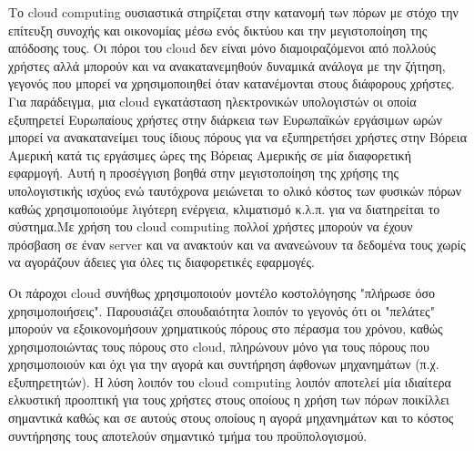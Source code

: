 	Το cloud computing ουσιαστικά στηρίζεται στην κατανομή των πόρων με στόχο την επίτευξη συνοχής και οικονομίας μέσω ενός δικτύου και την μεγιστοποίηση της απόδοσης τους. Οι πόροι του cloud δεν είναι μόνο διαμοιραζόμενοι από πολλούς χρήστες αλλά μπορούν και να ανακατανεμηθούν δυναμικά ανάλογα με την ζήτηση, γεγονός που μπορεί να χρησιμοποιηθεί όταν κατανέμονται στους διάφορους χρήστες.  Για παράδειγμα, μια cloud εγκατάσταση ηλεκτρονικών υπολογιστών οι οποία εξυπηρετεί Ευρωπαίους χρήστες στην διάρκεια των Ευρωπαϊκών εργάσιμων ωρών μπορεί να ανακατανείμει τους ίδιους πόρους για να εξυπηρετήσει χρήστες στην Βόρεια Αμερική κατά τις εργάσιμες ώρες της Βόρειας Αμερικής σε μία διαφορετική εφαρμογή. Αυτή η προσέγγιση βοηθά στην μεγιστοποίηση της χρήσης της υπολογιστικής ισχύος ενώ ταυτόχρονα μειώνεται το ολικό κόστος των φυσικών πόρων καθώς χρησιμοποιούμε λιγότερη ενέργεια, κλιματισμό κ.λ.π. για να διατηρείται το σύστημα.Με χρήση του cloud computing πολλοί χρήστες μπορούν να έχουν πρόσβαση σε έναν server και να ανακτούν και να ανανεώνουν τα δεδομένα τους χωρίς να αγοράζουν άδειες για όλες τις διαφορετικές εφαρμογές. \cite{Grossm2009}
	
	Οι πάροχοι cloud συνήθως χρησιμοποιούν μοντέλο κοστολόγησης "πλήρωσε όσο χρησιμοποιήσεις".  Παρουσιάζει σπουδαιότητα λοιπόν το γεγονός ότι οι "πελάτες" μπορούν να εξοικονομήσουν χρηματικούς πόρους στο πέρασμα του χρόνου, καθώς χρησιμοποιώντας τους πόρους στο cloud, πληρώνουν μόνο για τους πόρους που χρησιμοποιούν και όχι για την αγορά και συντήρηση άφθονων μηχανημάτων (π.χ. εξυπηρετητών). Η λύση λοιπόν του cloud computing λοιπόν αποτελεί μία ιδιαίτερα ελκυστική προοπτική για τους χρήστες στους οποίους η χρήση των πόρων ποικίλλει σημαντικά καθώς και σε αυτούς στους οποίους  η αγορά μηχανημάτων και το κόστος συντήρησης τους αποτελούν σημαντικό τμήμα του προϋπολογισμού. 

